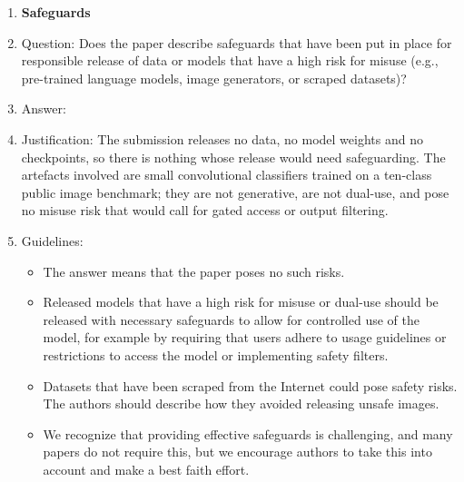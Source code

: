 \begin{enumerate}
\item {\bf Safeguards}
    \item[] Question: Does the paper describe safeguards that have been put in place for responsible release of data or models that have a high risk for misuse (e.g., pre-trained language models, image generators, or scraped datasets)?
    \item[] Answer: \answerNA{}
    \item[] Justification: The submission releases no data, no model weights and no checkpoints, so there is nothing whose release would need safeguarding. The artefacts involved are small convolutional classifiers trained on a ten-class public image benchmark; they are not generative, are not dual-use, and pose no misuse risk that would call for gated access or output filtering.
    \item[] Guidelines:
    \begin{itemize}
        \item The answer \answerNA{} means that the paper poses no such risks.
        \item Released models that have a high risk for misuse or dual-use should be released with necessary safeguards to allow for controlled use of the model, for example by requiring that users adhere to usage guidelines or restrictions to access the model or implementing safety filters.
        \item Datasets that have been scraped from the Internet could pose safety risks. The authors should describe how they avoided releasing unsafe images.
        \item We recognize that providing effective safeguards is challenging, and many papers do not require this, but we encourage authors to take this into account and make a best faith effort.
    \end{itemize}


\end{enumerate}
